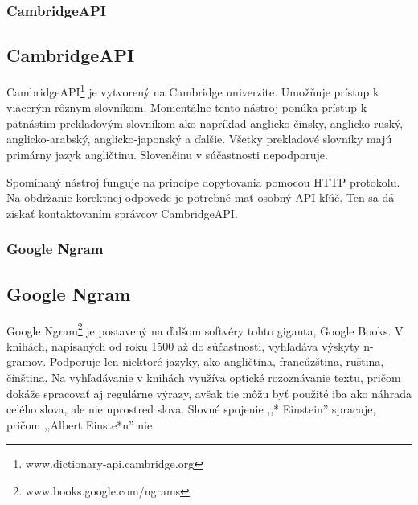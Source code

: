 %
%
{
	\subsubsection{CambridgeAPI}
}
{
	\subsection{CambridgeAPI}
}
\label{subsubsec:cambridgeapi}
CambridgeAPI\footnote{www.dictionary-api.cambridge.org} je vytvorený na Cambridge univerzite. Umožňuje prístup k viacerým rôznym slovníkom. Momentálne tento nástroj ponúka prístup k pätnástim prekladovým slovníkom ako napríklad anglicko-čínsky, anglicko-ruský, anglicko-arabský, anglicko-japonský a ďalšie. Všetky prekladové slovníky majú primárny jazyk angličtinu. Slovenčinu v súčastnosti nepodporuje.

Spomínaný nástroj funguje na princípe dopytovania pomocou HTTP protokolu. Na obdržanie korektnej odpovede je potrebné mať osobný API kľúč. Ten sa dá získať kontaktovaním správcov CambridgeAPI.

%
%
{
	\subsubsection{Google Ngram}
}
{
	\subsection{Google Ngram}
}
\label{subsubsec:googlengram}
Google Ngram\footnote{www.books.google.com/ngrams} je postavený na ďalšom softvéry tohto giganta, Google Books. V knihách,  napísaných od roku 1500 až do súčastnosti, vyhľadáva výskyty n-gramov. Podporuje len niektoré jazyky, ako angličtina, francúzština, ruština, čínština. Na vyhľadávanie v knihách využíva optické rozoznávanie textu, pričom dokáže spracovať aj regulárne výrazy, avšak tie môžu byť použité iba ako náhrada celého slova, ale nie uprostred slova. Slovné spojenie ,,* Einstein'' spracuje, pričom ,,Albert Einste*n'' nie.

